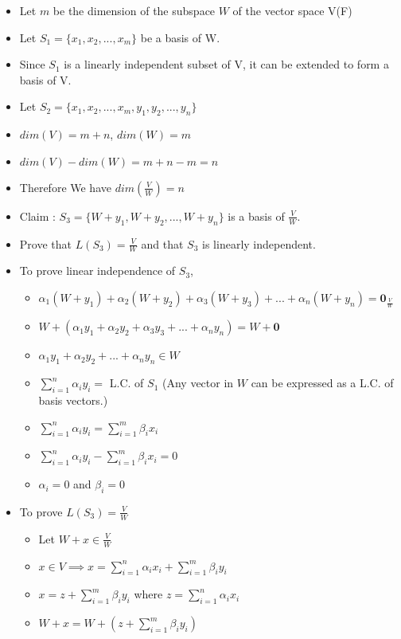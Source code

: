 \documentclass[twoside]{article}
\begin{document}
\begin{itemize}
\begin{itemize}
			\item Let $m$ be the dimension of the subspace $W$ of the vector space V(F)
			\item Let $S_1 = \{x_1, x_2, ..., x_m\}$ be a basis of W.
			\item Since $S_1$ is a linearly independent subset of V, it can be extended to form a basis of V.
			\item Let $S_2 = \{x_1, x_2, ..., x_m, y_1, y_2, ..., y_n\}$
			\item $dim(V) = m + n$, $dim(W) = m$
			\item $dim(V) - dim(W) = m + n - m = n$
			\item Therefore We have $dim\left(\frac{V}{W}\right)=n$
			\item Claim : $S_3 = \{W + y_1, W + y_2, ..., W + y_n\}$ is a basis of $\frac{V}{W}$.
			\item Prove that $L(S_3) = \frac{V}{W}$ and that $S_3$ is linearly independent.
			\item To prove linear independence of $S_3$,
			\begin{itemize}
				\item $\alpha_1 (W + y_1) + \alpha_2 (W + y_2) + \alpha_3 (W + y_3) + ... + \alpha_n (W + y_n) = \mathbf{0}_{\frac{V}{W}}$
				\item $W + (\alpha_1 y_1 + \alpha_2 y_2 + \alpha_3 y_3 + ... + \alpha_n y_n) = W + \mathbf{0}$
				\item $\alpha_1 y_1 + \alpha_2 y_2 + ... + \alpha_n y_n \in W$
				\item $\sum_{i=1}^{n} \alpha_i y_i =$ L.C. of $S_1$ (Any vector in $W$ can be expressed as a L.C. of basis vectors.)
				\item $\sum_{i=1}^{n} \alpha_i y_i = \sum_{i=1}^{m} \beta_i x_i$
				\item $\sum_{i=1}^{n} \alpha_i y_i - \sum_{i=1}^{m} \beta_i x_i = 0$
				\item $\alpha_i = 0$ and $\beta_i = 0$
			\end{itemize}
			\item To prove $L(S_3) = \frac{V}{W}$
			\begin{itemize}
				\item Let $W + x \in \frac{V}{W}$
				\item $x \in V \implies x = \sum_{i = 1}^{n}\alpha_i x_i + \sum_{i=1}^{m} \beta_i y_i$
				\item $x = z + \sum_{i = 1}^{m}\beta_i y_i$ where $z =\sum_{i = 1}^{n}\alpha_i x_i$
				\item $W + x = W + (z + \sum_{i = 1}^{m}\beta_i y_i)$

\end{itemize}
\end{itemize}
\end{itemize}
\end{document}
